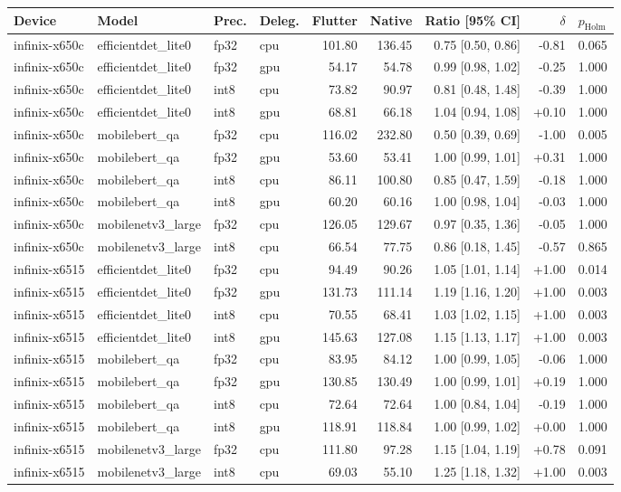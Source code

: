 \begin{tabular}{llllrrrrl}
\toprule
Device & Model & Prec. & Deleg. & Flutter & Native & Ratio [95\% CI] & $\delta$ & $p_{\mathrm{Holm}}$ \\
\midrule
infinix-x650c & efficientdet\_lite0 & fp32 & cpu & 101.80 & 136.45 & 0.75 [0.50, 0.86] & -0.81 & 0.065 \\
infinix-x650c & efficientdet\_lite0 & fp32 & gpu & 54.17 & 54.78 & 0.99 [0.98, 1.02] & -0.25 & 1.000 \\
infinix-x650c & efficientdet\_lite0 & int8 & cpu & 73.82 & 90.97 & 0.81 [0.48, 1.48] & -0.39 & 1.000 \\
infinix-x650c & efficientdet\_lite0 & int8 & gpu & 68.81 & 66.18 & 1.04 [0.94, 1.08] & +0.10 & 1.000 \\
infinix-x650c & mobilebert\_qa & fp32 & cpu & 116.02 & 232.80 & 0.50 [0.39, 0.69] & -1.00 & 0.005 \\
infinix-x650c & mobilebert\_qa & fp32 & gpu & 53.60 & 53.41 & 1.00 [0.99, 1.01] & +0.31 & 1.000 \\
infinix-x650c & mobilebert\_qa & int8 & cpu & 86.11 & 100.80 & 0.85 [0.47, 1.59] & -0.18 & 1.000 \\
infinix-x650c & mobilebert\_qa & int8 & gpu & 60.20 & 60.16 & 1.00 [0.98, 1.04] & -0.03 & 1.000 \\
infinix-x650c & mobilenetv3\_large & fp32 & cpu & 126.05 & 129.67 & 0.97 [0.35, 1.36] & -0.05 & 1.000 \\
infinix-x650c & mobilenetv3\_large & int8 & cpu & 66.54 & 77.75 & 0.86 [0.18, 1.45] & -0.57 & 0.865 \\
infinix-x6515 & efficientdet\_lite0 & fp32 & cpu & 94.49 & 90.26 & 1.05 [1.01, 1.14] & +1.00 & 0.014 \\
infinix-x6515 & efficientdet\_lite0 & fp32 & gpu & 131.73 & 111.14 & 1.19 [1.16, 1.20] & +1.00 & 0.003 \\
infinix-x6515 & efficientdet\_lite0 & int8 & cpu & 70.55 & 68.41 & 1.03 [1.02, 1.15] & +1.00 & 0.003 \\
infinix-x6515 & efficientdet\_lite0 & int8 & gpu & 145.63 & 127.08 & 1.15 [1.13, 1.17] & +1.00 & 0.003 \\
infinix-x6515 & mobilebert\_qa & fp32 & cpu & 83.95 & 84.12 & 1.00 [0.99, 1.05] & -0.06 & 1.000 \\
infinix-x6515 & mobilebert\_qa & fp32 & gpu & 130.85 & 130.49 & 1.00 [0.99, 1.01] & +0.19 & 1.000 \\
infinix-x6515 & mobilebert\_qa & int8 & cpu & 72.64 & 72.64 & 1.00 [0.84, 1.04] & -0.19 & 1.000 \\
infinix-x6515 & mobilebert\_qa & int8 & gpu & 118.91 & 118.84 & 1.00 [0.99, 1.02] & +0.00 & 1.000 \\
infinix-x6515 & mobilenetv3\_large & fp32 & cpu & 111.80 & 97.28 & 1.15 [1.04, 1.19] & +0.78 & 0.091 \\
infinix-x6515 & mobilenetv3\_large & int8 & cpu & 69.03 & 55.10 & 1.25 [1.18, 1.32] & +1.00 & 0.003 \\
\bottomrule
\end{tabular}
